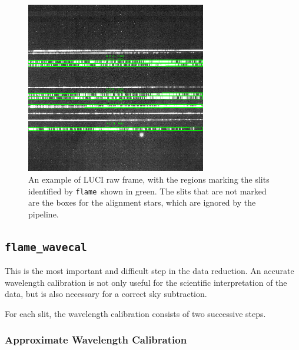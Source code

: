 \documentclass[a4paper, notitlepage]{article}
\newcommand{\flame}{\texttt{flame}}
\begin{document}
\begin{figure}[htbp]
\centering
\includegraphics[width=0.7\textwidth]{slits}
\caption{An example of LUCI raw frame, with the regions marking the slits identified by \flame\ shown in green. The slits that are not marked are the boxes for the alignment stars, which are ignored by the pipeline.}
\label{fig:slits}
\end{figure}



\subsection{\texttt{flame\_wavecal}}

This is the most important and difficult step in the data reduction. An accurate wavelength calibration is not only useful for the scientific interpretation of the data, but is also necessary for a correct sky subtraction. 

For each slit, the wavelength calibration consists of two successive steps.


\subsubsection{Approximate Wavelength Calibration}
\end{document}
